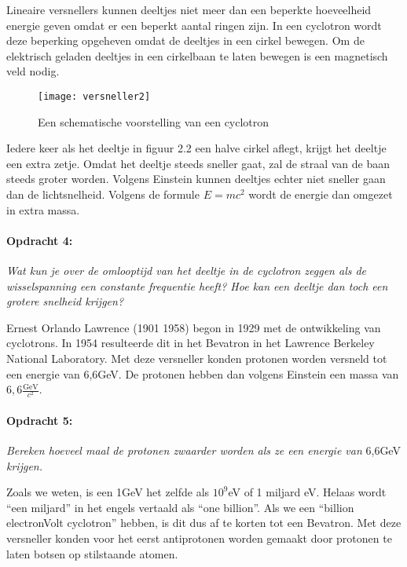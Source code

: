 Lineaire versnellers kunnen deeltjes niet meer dan een beperkte hoeveelheid
energie geven omdat er een beperkt aantal ringen zijn. In een cyclotron
wordt deze beperking opgeheven omdat de deeltjes in een cirkel bewegen.
Om de elektrisch geladen deeltjes in een cirkelbaan te laten bewegen
is een magnetisch veld nodig.

\begin{figure}[h]
\noindent \begin{centering}
\texttt{[image: versneller2]}
\par\end{centering}

\caption{Een schematische voorstelling van een cyclotron}
\end{figure}


Iedere keer als het deeltje in figuur 2.2 een halve cirkel aflegt,
krijgt het deeltje een extra zetje. Omdat het deeltje steeds sneller
gaat, zal de straal van de baan steeds groter worden. Volgens Einstein
kunnen deeltjes echter niet sneller gaan dan de lichtsnelheid. Volgens
de formule $E=mc^{2}$ wordt de energie dan omgezet in extra massa.


\paragraph*{Opdracht 4:}

\emph{Wat kun je over de omlooptijd van het deeltje in de cyclotron
zeggen als de wisselspanning een constante frequentie heeft? Hoe kan
een deeltje dan toch een grotere snelheid krijgen?}

Ernest Orlando Lawrence (1901 \textendash{} 1958) begon in 1929 met
de ontwikkeling van cyclotrons. In 1954 resulteerde dit in het Bevatron
in het Lawrence Berkeley National Laboratory. Met deze versneller
konden protonen worden versneld tot een energie van 6,6GeV. De protonen
hebben dan volgens Einstein een massa van $6,6\frac{\mathrm{GeV}}{c^{2}}$. 


\paragraph*{Opdracht 5:}

\emph{Bereken hoeveel maal de protonen zwaarder worden als ze een
energie van }6,6GeV\emph{ krijgen.}

Zoals we weten, is een 1GeV het zelfde als $10^{9}$eV of 1 miljard
eV. Helaas wordt ``een miljard'' in het engels vertaald als ``one
billion''. Als we een ``billion electronVolt cyclotron'' hebben,
is dit dus af te korten tot een Bevatron. Met deze versneller konden
voor het eerst antiprotonen worden gemaakt door protonen te laten
botsen op stilstaande atomen. 


